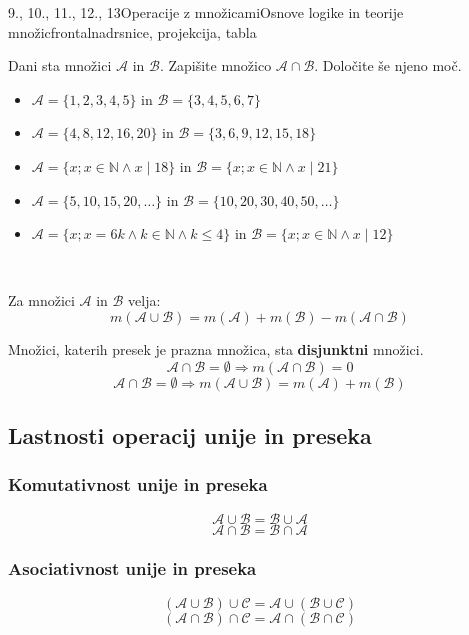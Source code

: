 \begin{priprava}{9., 10., 11., 12., 13}{}{Operacije z množicami}{Osnove logike in teorije množic}{frontalna}{drsnice, projekcija, tabla}
            \begin{naloga}
                Dani sta množici $\mathcal{A}$ in $\mathcal{B}$. Zapišite množico $\mathcal{A}\cap\mathcal{B}$.
                Določite še njeno moč.
                \begin{itemize}
                    \item $\mathcal{A}=\{1,2,3,4,5\}$ in $\mathcal{B}=\{3,4,5,6,7\}$
                    \item $\mathcal{A}=\{4,8,12,16,20\}$ in $\mathcal{B}=\{3,6,9,12,15,18\}$
                    \item $\mathcal{A}=\{x; x\in\mathbb{N} \land x\mid 18\}$ in $\mathcal{B}=\{x; x\in\mathbb{N} \land x\mid 21\}$
                    \item $\mathcal{A}=\{5,10,15,20,\dots\}$ in $\mathcal{B}=\{10, 20, 30, 40, 50, \dots\}$
                    \item $\mathcal{A}=\{x; x=6k \land k\in\mathbb{N} \land k\leq 4\}$ in $\mathcal{B}=\{x; x\in\mathbb{N} \land x\mid 12\}$
                \end{itemize}
            \end{naloga}
    
~

    Za množici $\mathcal{A}$ in $\mathcal{B}$ velja:
    $$m(\mathcal{A}\cup\mathcal{B})=m(\mathcal{A})+m(\mathcal{B})-m(\mathcal{A}\cap\mathcal{B}) $$



    Množici, katerih presek je prazna množica, sta \textbf{disjunktni} množici.
    $$\mathcal{A}\cap\mathcal{B}=\emptyset\Rightarrow m(\mathcal{A}\cap\mathcal{B})=0 $$ 
    $$\mathcal{A}\cap\mathcal{B}=\emptyset\Rightarrow m(\mathcal{A}\cup\mathcal{B})=m(\mathcal{A})+m(\mathcal{B}) $$


\subsection{Lastnosti operacij unije in preseka}
        \subsubsection{Komutativnost unije in preseka}
            $$ \mathcal{A}\cup\mathcal{B}=\mathcal{B}\cup\mathcal{A} $$
            $$ \mathcal{A}\cap\mathcal{B}=\mathcal{B}\cap\mathcal{A} $$
        

            \subsubsection{Asociativnost unije in preseka}
            $$ \left(\mathcal{A}\cup\mathcal{B}\right)\cup\mathcal{C}=\mathcal{A}\cup\left(\mathcal{B}\cup\mathcal{C}\right) $$
            $$ \left(\mathcal{A}\cap\mathcal{B}\right)\cap\mathcal{C}=\mathcal{A}\cap\left(\mathcal{B}\cap\mathcal{C}\right) $$



\end{priprava}
